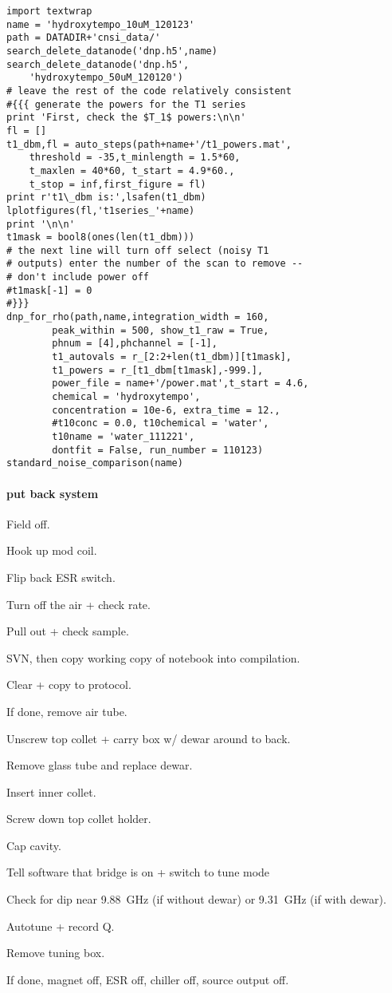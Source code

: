 \begin{tiny}
\begin{lstlisting}
import textwrap
name = 'hydroxytempo_10uM_120123'
path = DATADIR+'cnsi_data/'
search_delete_datanode('dnp.h5',name)
search_delete_datanode('dnp.h5',
    'hydroxytempo_50uM_120120')
# leave the rest of the code relatively consistent
#{{{ generate the powers for the T1 series
print 'First, check the $T_1$ powers:\n\n'
fl = []
t1_dbm,fl = auto_steps(path+name+'/t1_powers.mat',
    threshold = -35,t_minlength = 1.5*60,
    t_maxlen = 40*60, t_start = 4.9*60.,
    t_stop = inf,first_figure = fl)
print r't1\_dbm is:',lsafen(t1_dbm)
lplotfigures(fl,'t1series_'+name)
print '\n\n'
t1mask = bool8(ones(len(t1_dbm)))
# the next line will turn off select (noisy T1
# outputs) enter the number of the scan to remove --
# don't include power off
#t1mask[-1] = 0
#}}}
dnp_for_rho(path,name,integration_width = 160,
        peak_within = 500, show_t1_raw = True,
        phnum = [4],phchannel = [-1],
        t1_autovals = r_[2:2+len(t1_dbm)][t1mask],
        t1_powers = r_[t1_dbm[t1mask],-999.],
        power_file = name+'/power.mat',t_start = 4.6,
        chemical = 'hydroxytempo',
        concentration = 10e-6, extra_time = 12.,
        #t10conc = 0.0, t10chemical = 'water',
        t10name = 'water_111221',
        dontfit = False, run_number = 110123)
standard_noise_comparison(name)
\end{lstlisting}
\end{tiny}

\paragraph{put back system}

Field off.

Hook up mod coil.

Flip back ESR switch.

Turn off the air + check rate.

Pull out + check sample.

SVN, then copy working copy of notebook into compilation.


Clear + copy to protocol.

\timeblockend
If done, remove air tube.

Unscrew top collet + carry box w/ dewar around to back.

Remove glass tube and replace dewar.

Insert inner collet.

Screw down top collet holder.

Cap cavity.

Tell software that bridge is on + switch to tune mode

Check for dip near 9.88~GHz (if without dewar) or 9.31~GHz (if with dewar).

Autotune + record Q.

Remove tuning box.

If done, magnet off, ESR off, chiller off, source output off.

